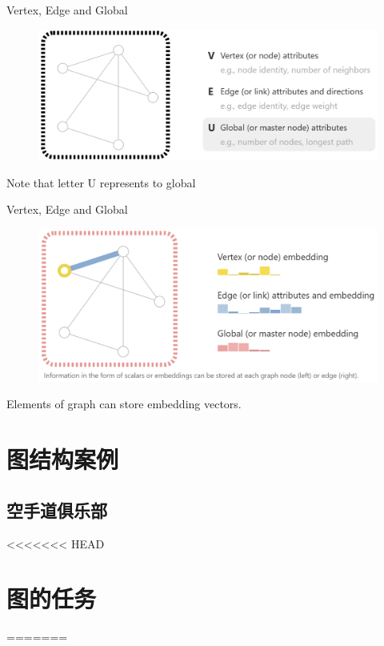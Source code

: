 \documentclass{beamer}
\begin{document}
\begin{frame}{Vertex, Edge and Global}
    \begin{figure}
        \includegraphics[width=\textwidth]{global.png}
    \end{figure}
    Note that letter U represents to global
\end{frame}

\begin{frame}{Vertex, Edge and Global}
    \begin{figure}
        \includegraphics[width=\textwidth]{graph.png}
    \end{figure}
    Elements of graph can store embedding vectors.
\end{frame}

\section{图结构案例}

\subsection{空手道俱乐部}

\begin{frame}

\end{frame}


<<<<<<< HEAD
\section{图的任务}
=======
\end{document}
